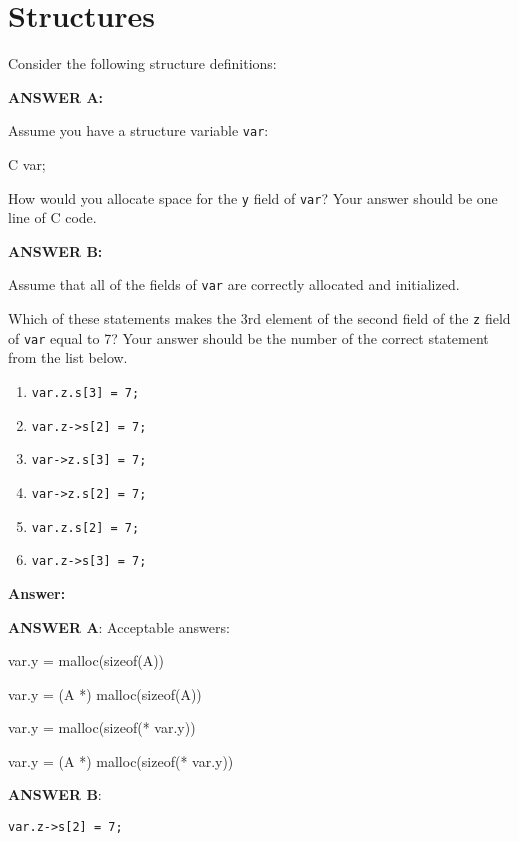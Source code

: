 \newpage
\section{Structures} 

Consider the following structure definitions:

\resetlinenumber[1]
\linenumbers
\begin{tt}
  
\end{tt}
\nolinenumbers

\vspace{0.2in}

{\bf ANSWER A:} 

Assume you have a structure variable {\tt var}:

\begin{tt}
C var;
\end{tt}

How would you allocate space for the {\tt y} field of {\tt var}? Your answer should be one line of C code.

\vspace{0.2in}

{\bf ANSWER B:}

Assume that all of the fields of {\tt var} are correctly allocated and initialized.

Which of these statements makes the 3rd element of the second field of the {\tt z} field of {\tt var} equal to 7? Your answer should be the number of the correct statement from the list below.

\begin{enumerate}
\item {\tt var.z.s[3] = 7;}
\item {\tt var.z->s[2] = 7;}
\item {\tt var->z.s[3] = 7;}
\item {\tt var->z.s[2] = 7;}
\item {\tt var.z.s[2] = 7;}
\item {\tt var.z->s[3] = 7;}
\end{enumerate}


\vspace{0.2in}

\ifexam


\else


{\bf Answer:}

{\bf ANSWER A}: 
Acceptable answers:

var.y = malloc(sizeof(A))

var.y = (A *) malloc(sizeof(A))

var.y = malloc(sizeof(* var.y))

var.y = (A *) malloc(sizeof(* var.y))

{\bf ANSWER B}:

{\tt var.z->s[2] = 7;}

\fi
